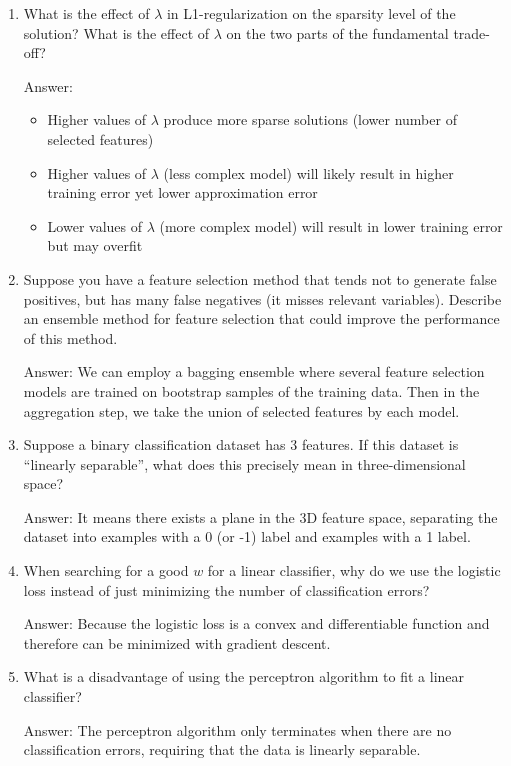 \documentclass{article}
\newenvironment{answer}{\par\begingroup\color{gre}Answer: }{\endgroup}
\begin{document}
\begin{enumerate}
\item What is the effect of $\lambda$ in L1-regularization on the sparsity level of the solution? What is the effect of $\lambda$ on the two parts of the fundamental trade-off?
\begin{answer}
    \begin{itemize}
        \item Higher values of $\lambda$ produce more sparse solutions (lower number of selected features)
        \item Higher values of $\lambda$ (less complex model) will likely result in higher training error yet lower approximation error
        \item Lower values of $\lambda$ (more complex model) will result in lower training error but may overfit
    \end{itemize}
\end{answer}

\item Suppose you have a feature selection method that tends not to generate false positives, but has many false negatives (it misses relevant variables). Describe an ensemble method for feature selection that could improve the performance of this method.
\begin{answer}
    We can employ a bagging ensemble where several feature selection models are trained on bootstrap samples of the training data. Then in the aggregation step, we take the union of selected features by each model.
\end{answer}

\item Suppose a binary classification dataset has 3 features. If this dataset is ``linearly separable'', what does this precisely mean in three-dimensional space?
\begin{answer}
    It means there exists a plane in the 3D feature space, separating the dataset into examples with a 0 (or -1) label and examples with a 1 label.
\end{answer}

\item When searching for a good $w$ for a linear classifier, why do we use the logistic loss instead of just minimizing the number of classification errors?
\begin{answer}
    Because the logistic loss is a convex and differentiable function and therefore can be minimized with gradient descent.
\end{answer}


\item What is a disadvantage of using the perceptron algorithm to fit a linear classifier?
\begin{answer}
    The perceptron algorithm only terminates when there are no classification errors, requiring that the data is linearly separable.
\end{answer}


\end{enumerate}
\end{document}
